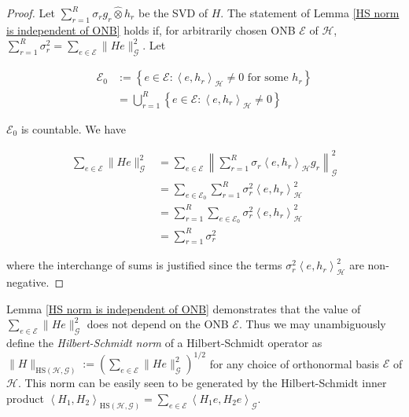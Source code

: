 \documentclass{article}
\numberwithin{theorem}{section}
\numberwithin{lemma}{section}
\numberwithin{definition}{section}
\numberwithin{assumption}{section}
\numberwithin{proposition}{section}
\numberwithin{remark}{section}
\numberwithin{corollary}{section}
\numberwithin{conjecture}{section}
\numberwithin{example}{section}
\newcommand{\bset}[1]{\left \lbrace #1 \right \rbrace}
\newcommand{\aset}[1]{\left \langle #1 \right \rangle}
\newcommand{\HS}{\mathrm{HS}}
\newcommand{\CH}{\mathcal H}
\begin{document}
\begin{multicols*}{2}
\begin{proof}
	Let $\sum_{r=1}^R \sigma_r g_r \widehat \otimes h_r$ be the SVD of $H$. The statement of Lemma \ref{HS norm is independent of ONB} holds if, for arbitrarily chosen ONB $\mathscr E$ of $\CH$, $\sum_{r=1}^R \sigma_r^2  = \sum_{e \in \mathscr E} \|He\|_\mathcal G^2$. Let 
	
	\begin{align*}
		\mathscr E_0 &:= \bset{e \in \mathscr E: \aset{e,h_r}_\CH \neq 0 \text{ for some } h_r}
		\\&= \bigcup_{r=1}^R \bset{e \in \mathscr E: \aset{e, h_r}_\CH \neq 0}
	\end{align*}
	
	$\mathscr E_0$ is countable. We have 
	
	\begin{align*}
		\sum_{e \in \mathscr E} \|He\|_\mathcal G^2
		&= 
		\sum_{e \in \mathscr E} \left \|\sum_{r=1}^R \sigma_r \aset{e, h_r}_\CH g_r \right \|_\mathcal G^2
		\\&= 
		\sum_{e \in \mathscr E_0} \sum_{r=1}^R \sigma_r^2 \aset{e, h_r}_\CH^2 
			\\&= 
	\sum_{r=1}^R \sum_{e \in \mathscr E_0}  \sigma_r^2 \aset{e, h_r}_\CH^2 
		\\&= 
	\sum_{r=1}^R   \sigma_r^2  
	\end{align*}
	
	
	where the interchange of sums is justified since the terms $\sigma_r^2 \aset{e, h_r}_\CH^2 $ are non-negative. 

	
\end{proof}


Lemma \ref{HS norm is independent of ONB} demonstrates that the value of $\sum_{e \in \mathscr E} \|He\|^2_\mathcal G$ does not depend on the ONB $\mathscr E$. Thus we may unambiguously define the \textit{Hilbert-Schmidt norm} of a Hilbert-Schmidt operator as $\|H\|_{\HS(\mathcal H, \mathcal G)} :=  \left( \sum_{e \in \mathscr E} \|He\|^2_\mathcal G \right)^{1/2}$ for any choice of orthonormal basis $\mathscr E$ of $\mathcal H$. This norm can be easily seen to be generated by the Hilbert-Schmidt inner product $\aset{H_1, H_2}_{\HS(\mathcal H, \mathcal G)} = \sum_{e \in \mathscr E} \aset{H_1e, H_2e}_\mathcal G$.


\end{multicols*}
\end{document}
